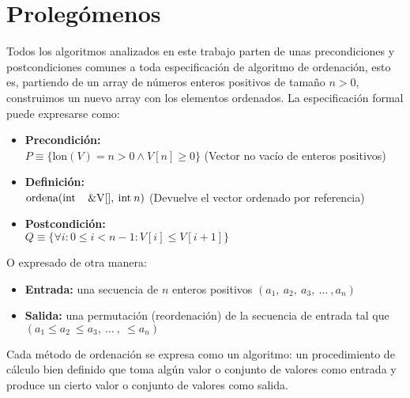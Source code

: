 \section{Proleg\'omenos}
Todos los algoritmos analizados en este trabajo parten de unas precondiciones y postcondiciones comunes a toda especificación de algoritmo de ordenación, esto es, partiendo de un array de números enteros positivos de tamaño $n > 0$, construimos un nuevo array con los elementos ordenados.  La especificación formal puede expresarse como:
\begin{itemize}
\item \textbf{Precondición:}\\
$P \equiv \{\mbox{lon}(V) = n > 0 \wedge V[n] \geq 0\}$ (Vector no vacío de enteros positivos)
\item \textbf{Definición:}\\$\mbox{ordena}(\mbox{int \:\: \&V} [],\: \mbox{int} \:n)$ (Devuelve el vector ordenado por referencia)
\item \textbf{Postcondición:}\\
$Q \equiv \{\forall{i} : 0 \leq i < n - 1: V[i] \leq V[i + 1]\}$
\end{itemize}
O expresado de otra manera:\cite{CORMEN} 
\begin{itemize}
\item \textbf{Entrada:} una secuencia de $n$ enteros positivos $(a_{1},\: a_{2},\: a_{3}, \:  \ldots\: ,a_{n})$
\item \textbf{Salida:} una permutación (reordenación) de la secuencia de entrada tal que $(a_{1} \leq a_{2}\:  \leq a_{3},\:  \ldots \:  ,\:\leq  a_{n})$
\end{itemize}

Cada método de ordenación se expresa como un algoritmo: un procedimiento de cálculo bien definido que toma algún valor o conjunto de valores como entrada y produce un cierto valor o conjunto de valores como salida. 
